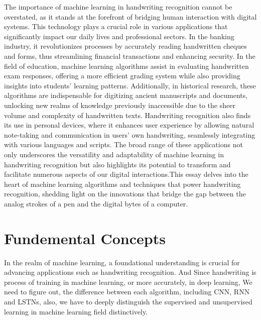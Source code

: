 \documentclass[12pt]{article}
\begin{document}
The importance of machine learning in handwriting recognition cannot be overstated, as it stands at the forefront of bridging human interaction with digital systems. This technology plays a crucial role in various applications that significantly impact our daily lives and professional sectors. In the banking industry, it revolutionizes processes by accurately reading handwritten cheques and forms, thus streamlining financial transactions and enhancing security. In the field of education, machine learning algorithms assist in evaluating handwritten exam responses, offering a more efficient grading system while also providing insights into students' learning patterns. Additionally, in historical research, these algorithms are indispensable for digitizing ancient manuscripts and documents, unlocking new realms of knowledge previously inaccessible due to the sheer volume and complexity of handwritten texts. Handwriting recognition also finds its use in personal devices, where it enhances user experience by allowing natural note-taking and communication in users' own handwriting, seamlessly integrating with various languages and scripts. The broad range of these applications not only underscores the versatility and adaptability of machine learning in handwriting recognition but also highlights its potential to transform and facilitate numerous aspects of our digital interactions.This essay delves into the heart of machine learning algorithms and techniques that power handwriting recognition, shedding light on the innovations that bridge the gap between the analog strokes of a pen and the digital bytes of a computer.

\section* {Fundemental Concepts}
In the realm of machine learning, a foundational understanding is crucial for advancing applications such as handwriting recognition. And Since handwriting is process of training in machine learning, or more accurately, in deep learning, We need to figure out, the difference between each algorithm, including CNN, RNN and LSTNs, also, we have to deeply distinguish the supervised and unsupervised learning in machine learning field distinctively.
\end{document}
